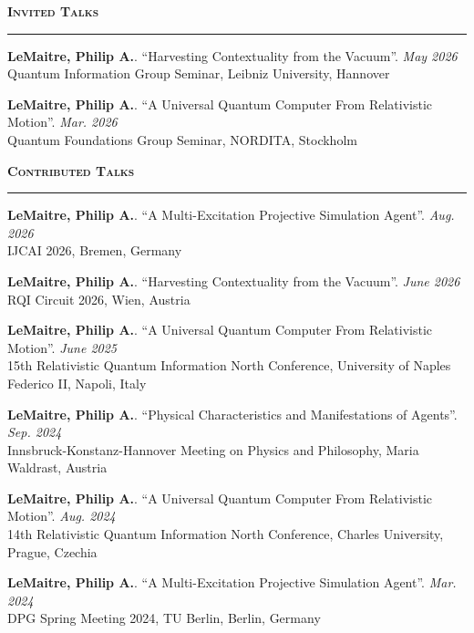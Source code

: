 \vspace{0.15em}
\noindent\textsc{\textbf{Invited Talks}}\par
\sectionlineskip\noindent\rule{\linewidth}{0.4pt}\par\vspace{0.45em}
\textbf{LeMaitre, Philip A.}. “Harvesting Contextuality from the Vacuum”. \hfill\textit{{May 2026}}\\
Quantum Information Group Seminar, Leibniz University, Hannover

\textbf{LeMaitre, Philip A.}. “A Universal Quantum Computer From Relativistic Motion”. \hfill\textit{{Mar. 2026}}\\
Quantum Foundations Group Seminar, NORDITA, Stockholm

\vspace{0.65em}
\noindent\textsc{\textbf{Contributed Talks}}\par
\sectionlineskip\noindent\rule{\linewidth}{0.4pt}\par\vspace{0.45em}
\textbf{LeMaitre, Philip A.}. “A Multi-Excitation Projective Simulation Agent”. \hfill\textit{{Aug. 2026}}\\
IJCAI 2026, Bremen, Germany

\textbf{LeMaitre, Philip A.}. “Harvesting Contextuality from the Vacuum”. \hfill\textit{{June 2026}}\\
RQI Circuit 2026, Wien, Austria

\textbf{LeMaitre, Philip A.}. “A Universal Quantum Computer From Relativistic Motion”. \hfill\textit{{June 2025}}\\
15th Relativistic Quantum Information North Conference, University of Naples Federico II, Napoli, Italy

\textbf{LeMaitre, Philip A.}. “Physical Characteristics and Manifestations of Agents”. \hfill\textit{{Sep. 2024}}\\
Innsbruck-Konstanz-Hannover Meeting on Physics and Philosophy, Maria Waldrast, Austria

\textbf{LeMaitre, Philip A.}. “A Universal Quantum Computer From Relativistic Motion”. \hfill\textit{{Aug. 2024}}\\
14th Relativistic Quantum Information North Conference, Charles University, Prague, Czechia

\textbf{LeMaitre, Philip A.}. “A Multi-Excitation Projective Simulation Agent”. \hfill\textit{{Mar. 2024}}\\
DPG Spring Meeting 2024, TU Berlin, Berlin, Germany

